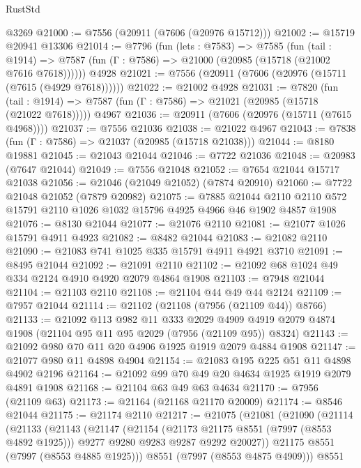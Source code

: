 \begin{lexlean}{RustStd}
\begin{coremodule}
    @3269
@21000 := @7556 (@20911 (@7606 (@20976 @15712)))
@21002 := @15719 @20941 @13306
@21014 := @7796
    (fun (lets : @7583) =>
    @7585
      (fun (tail : @1914) =>
      @7587 (fun (Γ : @7586) => @21000 (@20985 (@15718 (@21002 @7616 @7618))))))
    @4928
@21021 := @7556 (@20911 (@7606 (@20976 (@15711 (@7615 (@4929 @7618))))))
@21022 := @21002 @4928
@21031 := @7820
    (fun (tail : @1914) => @7587 (fun (Γ : @7586) => @21021 (@20985 (@15718 (@21022 @7618)))))
    @4967
@21036 := @20911 (@7606 (@20976 (@15711 (@7615 @4968))))
@21037 := @7556 @21036
@21038 := @21022 @4967
@21043 := @7838 (fun (Γ : @7586) => @21037 (@20985 (@15718 @21038)))
@21044 := @8180 @19881
@21045 := @21043 @21044
@21046 := @7722 @21036
@21048 := @20983 (@7647 @21044)
@21049 := @7556 @21048
@21052 := @7654 @21044 @15717 @21038
@21056 := @21046 (@21049 @21052) (@7874 @20910)
@21060 := @7722 @21048 @21052 (@7879 @20982)
@21075 := @7885
    @21044
    @2110
    @2110
    @572
    @15791
    @2110
    @1026
    @1032
    @15796
    @4925
    @4966
    @46
    @1902
    @4857
    @1908
@21076 := @8130 @21044
@21077 := @21076 @2110
@21081 := @21077 @1026 @15791 @4911 @4923
@21082 := @8482 @21044
@21083 := @21082 @2110
@21090 := @21083 @741 @1025 @335 @15791 @4911 @4921 @3710
@21091 := @8495 @21044
@21092 := @21091 @2110
@21102 := @21092 @68 @1024 @49 @334 @2124 @4910 @4920 @2079 @4864 @1908
@21103 := @7948 @21044
@21104 := @21103 @2110
@21108 := @21104 @44 @49 @44 @2124
@21109 := @7957 @21044
@21114 := @21102 (@21108 (@7956 (@21109 @44)) @8766)
@21133 := @21092
    @113
    @982
    @11
    @333
    @2029
    @4909
    @4919
    @2079
    @4874
    @1908
    (@21104 @95 @11 @95 @2029 (@7956 (@21109 @95)) @8324)
@21143 := @21092 @980 @70 @11 @20 @4906 @1925 @1919 @2079 @4884 @1908
@21147 := @21077 @980 @11 @4898 @4904
@21154 := @21083 @195 @225 @51 @11 @4898 @4902 @2196
@21164 := @21092 @99 @70 @49 @20 @4634 @1925 @1919 @2079 @4891 @1908
@21168 := @21104 @63 @49 @63 @4634
@21170 := @7956 (@21109 @63)
@21173 := @21164 (@21168 @21170 @20009)
@21174 := @8546 @21044
@21175 := @21174 @2110
@21217 := @21075
    (@21081
      (@21090
        (@21114
          (@21133
            (@21143
              (@21147
                (@21154
                  (@21173 @21175 @8551 (@7997 (@8553 @4892 @1925)))
                  @9277
                  @9280
                  @9283
                  @9287
                  @9292
                  @20027))
              @21175
              @8551
              (@7997 (@8553 @4885 @1925)))
            @8551
            (@7997 (@8553 @4875 @4909)))
          @8551

\end{coremodule}
\end{lexlean}
